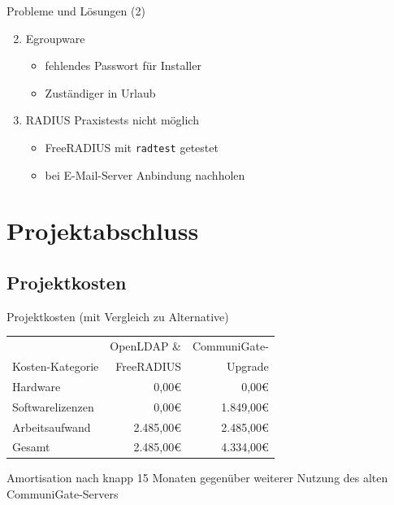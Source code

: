 \documentclass[presentation,svgnames,12pt]{beamer}
\begin{document}
\begin{frame}{Probleme und Lösungen (2)}
\begin{enumerate}
	\setcounter{enumi}{1}
	\item Egroupware
	\vspace{6pt}
	\begin{itemize}
		\item fehlendes Passwort für Installer
		\item Zuständiger in Urlaub
	\end{itemize}
	\medskip
	\item RADIUS Praxistests nicht möglich
	\vspace{6pt}
	\begin{itemize}
		\item FreeRADIUS mit \texttt{radtest} getestet
		\item bei E-Mail-Server Anbindung nachholen
	\end{itemize}
\end{enumerate}
\end{frame}

\section{Projektabschluss}
\subsection{Projektkosten}
\begin{frame}{Projektkosten (mit Vergleich zu Alternative)}
\begin{table}
\centering
	\begin{tabularx}{0.9\textwidth}{|X|r|r|}
		\hline
		 	&	OpenLDAP \& &	CommuniGate-\\
		Kosten-Kategorie	&	FreeRADIUS &	Upgrade\\
		\hline
		Hardware &	0,00\euro{} &	0,00\euro{}\\
		\hline
		Softwarelizenzen &	0,00\euro{} &	1.849,00\euro{}\\
		\hline
		Arbeitsaufwand &	2.485,00\euro{} &	2.485,00\euro{}\\
		\hhline{|=|=|=|}
		Gesamt &	2.485,00\euro{} &	4.334,00\euro{}\\
		\hline
	\end{tabularx}
\end{table}
\bigskip
Amortisation nach knapp 15 Monaten gegenüber weiterer Nutzung des alten CommuniGate-Servers
\end{frame}
\end{document}
